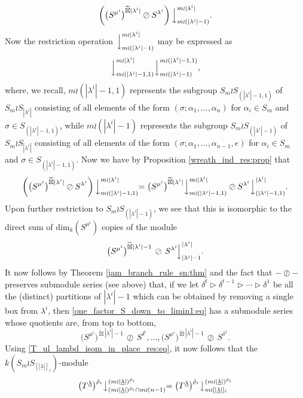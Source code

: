 \documentclass[10pt]{article}
\theoremstyle{definition}
\newcommand{\ul}[1]{\underline{#1}}
\begin{document}
\[\left(\bigl(S^{\mu^i}\bigr)^{\widetilde\boxtimes |\lambda^i|}\oslash S^{\lambda^i}\right)\Bigl\downarrow^{m \wr |\lambda^i|}_{m \wr (|\lambda^i|-1)}.\]
Now the restriction operation $\Bigl\downarrow^{m \wr |\lambda^i|}_{m \wr (|\lambda^i|-1)}$ may be expressed as
\[\Bigl\downarrow^{m \wr |\lambda^i|}_{m \wr (|\lambda^i|-1,1)}\Bigl\downarrow^{m \wr (|\lambda^i|-1,1)}_{m \wr (|\lambda^i|-1)},\]
where, we recall, $m \wr (|\lambda^i|-1,1)$ represents the subgroup $S_m \wr S_{(|\lambda^i|-1,1)}$ of $S_m \wr S_{|\lambda^i|}$ consisting of all
elements of the form $(\sigma;\alpha_1,\ldots,\alpha_n)$ for $\alpha_i \in S_m$ and $\sigma \in S_{(|\lambda^i|-1,1)}$, while
$m \wr (|\lambda^i|-1)$ represents the subgroup $S_m \wr S_{(|\lambda^i|-1)}$ of $S_m \wr S_{|\lambda^i|}$ consisting of all elements of the form
$(\sigma;\alpha_1,\ldots,\alpha_{n-1},e)$ for $\alpha_i \in S_m$ and $\sigma \in S_{(|\lambda^i|-1,1)}$. Now we have by
Proposition \ref{wreath_ind_res:prop} that
\[
\left(\bigl(S^{\mu^i}\bigr)^{\widetilde\boxtimes |\lambda^i|}\oslash S^{\lambda^i}\right)\Bigl\downarrow^{m \wr |\lambda^i|}_{m \wr (|\lambda^i|-1,1)}
=
\bigl(S^{\mu^i}\bigr)^{\widetilde\boxtimes |\lambda^i|}\Bigl\downarrow^{m \wr |\lambda^i|}_{m \wr (|\lambda^i|-1,1)}\:\oslash\:
S^{\lambda^i}\Bigl\downarrow^{|\lambda^i|}_{(|\lambda^i|-1,1)}.
\]
Upon further restriction to $S_m \wr S_{(|\lambda^i|-1)}$, we see that this is isomorphic to the direct sum of $\mathrm{dim}_k(S^{\mu^i})$
copies of the module
\begin{equation}\label{one_factor_S_down_to_limin1:eq}
\bigl(S^{\mu^i}\bigr)^{\widetilde\boxtimes |\lambda^i|-1}\,\oslash\,S^{\lambda^i}\!\Bigl\downarrow^{|\lambda^i|}_{|\lambda^i|-1}.
\end{equation}
It now follows by Theorem \ref{jam_branch_rule_sn:thm} and the fact that $- \oslash -$ preserves submodule series (see above)
that, if we let $\delta^{t} \triangleright \delta^{t-1} \triangleright \cdots \triangleright \delta^{1}$ be all the (distinct) partitions
of $|\lambda^i|-1$ which can be obtained by removing a single box from $\lambda^i$, then \eqref{one_factor_S_down_to_limin1:eq} has a
submodule series whose quotients are, from top to bottom,
\[
\bigl(S^{\mu^i}\bigr)^{\widetilde\boxtimes |\lambda^i|-1}\,\oslash\,S^{\delta^{t}},\ldots,
\bigl(S^{\mu^i}\bigr)^{\widetilde\boxtimes |\lambda^i|-1}\,\oslash\,S^{\delta^{1}}.
\]
Using \eqref{T_ul_lambd_isom_in_place_res:eq}, it now follows that the $k(S_m \wr S_{[|\ul{\lambda}|]_i})$-module
\[\bigl(T^{\ul{\lambda}}\bigr)^{\hat\rho_i}\bigl\downarrow^{(m{\wr}|\ul{\lambda}|)^{\hat\rho_i}}_{(m{\wr}|\ul{\lambda}|)^{\hat\rho_i} \cap m \wr (n-1)}
=
\bigl(T^{\ul{\lambda}}\bigr)^{\hat\rho_i}\bigl\downarrow^{(m{\wr}|\ul{\lambda}|)^{\hat\rho_i}}_{m \wr [|\ul{\lambda}|]_i}\]
\end{document}

